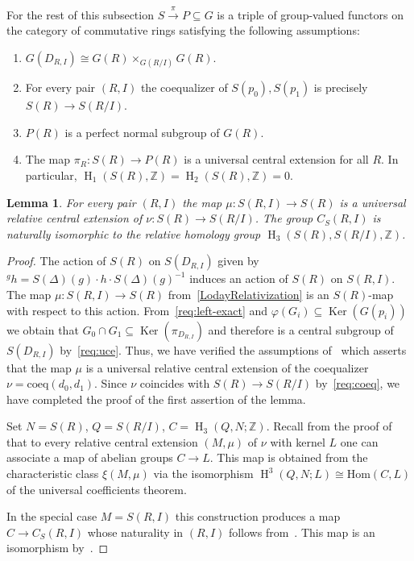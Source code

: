 \documentclass[oneside, 8pt]{amsart}
\newtheorem{lemma}{Lemma}
\theoremstyle{remark}
\theoremstyle{definition}
\numberwithin{lemma}{section}
\numberwithin{prop}{section}
\numberwithin{corollary}{section}
\DeclareMathOperator{\Ker}{Ker}
\DeclareMathOperator{\HH}{H}
\newcommand{\ZZ}{\mathbb{Z}}
\numberwithin{equation}{section}
\begin{document}
For the rest of this subsection $S \xrightarrow{\pi} P \subseteq G$ is a triple of group-valued functors on the category of commutative rings satisfying the following assumptions:
\begin{enumerate} [label=(A\arabic*)]
 \item \label{req:left-exact} $G(D_{R, I}) \cong G(R) \times_{G(R/I)} G(R)$.
 \item \label{req:coeq} For every pair $(R, I)$ the coequalizer of $S(p_0), S(p_1)$ is precisely $S(R) \to S(R/I)$.
 \item \label{req:subfunc} $P(R)$ is a perfect normal subgroup of $G(R)$.
 \item \label{req:uce} The map $ \pi_R \colon S(R) \to P(R)$ is a universal central extension for all $R$. In particular, $\HH_1(S(R), \ZZ) = \HH_2(S(R), \ZZ) = 0$.
\end{enumerate}

\begin{lemma}\label{lem:relativeH3}
 For every pair $(R, I)$ the map $\mu \colon S(R, I) \to S(R)$ is a universal relative central extension of $\nu \colon S(R) \to S(R/I)$. The group $C_S(R, I)$ is naturally isomorphic to the relative homology group $\HH_3(S(R), S(R/I), \ZZ)$.
\end{lemma}
\begin{proof}
The action of $S(R)$ on $S(D_{R, I})$ given by ${}^g h = S(\Delta)(g) \cdot h \cdot S(\Delta)(g)^{-1}$ induces an action of $S(R)$ on $S(R, I)$.
The map $\mu \colon S(R, I) \to S(R)$ from~\eqref{LodayRelativization} is an $S(R)$-map with respect to this action.
From~\ref{req:left-exact} and $\varphi(G_i) \subseteq \Ker(G(p_i))$ we obtain that 
$G_0 \cap G_1 \subseteq \Ker(\pi_{D_{R, I}})$ and therefore is a central subgroup of $S(D_{R,I})$ by~\ref{req:uce}. Thus, we have verified the assumptions of~\cite[Proposition~6]{Lo78} which asserts that the map $\mu$ is a universal relative central extension of the coequalizer $\nu = \mathrm{coeq}(d_0, d_1)$. Since $\nu$ coincides with $S(R) \to S(R/I)$ by~\ref{req:coeq}, we have completed the proof of the first assertion of the lemma.

Set $N = S(R)$, $Q = S(R/I)$, $C = \HH_3(Q, N; \ZZ)$. Recall from the proof of~\cite[Th{\'e}or{\`e}me~2]{Lo78} that to every relative central extension $(M, \mu)$ of $\nu$ with kernel $L$ one can associate a map of abelian groups $C \to L$. This map is obtained from the characteristic class $\xi(M, \mu)$ via the isomorphism $\HH^3(Q, N; L) \cong \mathrm{Hom}(C, L)$ of the universal coefficients theorem.

In the special case $M = S(R, I)$ this construction produces a map $C \to C_{S}(R, I)$ whose naturality in $(R, I)$ follows from~\cite[Proposition~3]{Lo78}. 
This map is an isomorphism by~\cite[Th{\'e}or{\`e}me~2]{Lo78}. \end{proof}
\end{document}
